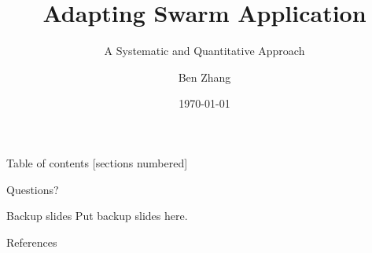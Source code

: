 \documentclass[10pt, handout]{beamer}
\title{Adapting Swarm Application}
\subtitle{A Systematic and Quantitative Approach}
\date{\today}
\author{Ben Zhang}
\begin{document}
\maketitle

\begin{frame}{Table of contents}
  [sections numbered]
  \tableofcontents[hideallsubsections]
\end{frame}


% 
% 
% 
% 

\appendix

% 

\begin{frame}[standout]
  Questions?
\end{frame}

\begin{frame}[fragile]{Backup slides}
  Put backup slides here.
\end{frame}

{
  \footnotesize
  \begin{frame}[allowframebreaks]{References}
    
    
  \end{frame}
}
\end{document}
